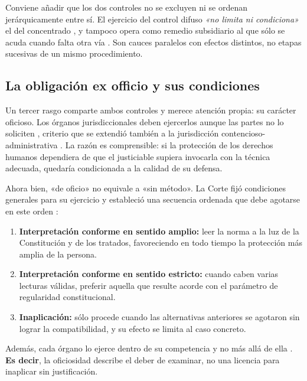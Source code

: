 \documentclass[
  spanish,
  letterpaper, oneside
]{article}
\begin{document}
Conviene añadir que los dos controles no se excluyen ni se ordenan jerárquicamente
entre sí. El ejercicio del control difuso \textit{«no limita ni condiciona»} el del
concentrado \citep{scjnTesis2002264}, y tampoco opera como remedio subsidiario al
que sólo se acuda cuando falta otra vía \citep{scjnTesis2010143}. Son cauces
paralelos con efectos distintos, no etapas sucesivas de un mismo procedimiento.

\subsection{La obligación ex officio y sus condiciones}

Un tercer rasgo comparte ambos controles y merece atención propia: su carácter
oficioso. Los órganos jurisdiccionales deben ejercerlos aunque las partes no lo
soliciten \citep{scjnTesis2003679}, criterio que se extendió también a la
jurisdicción contencioso-administrativa \citep{scjnTesis2005116}. La razón es
comprensible: si la protección de los derechos humanos dependiera de que el
justiciable supiera invocarla con la técnica adecuada, quedaría condicionada a la
calidad de su defensa.

Ahora bien, «de oficio» no equivale a «sin método». La Corte fijó condiciones
generales para su ejercicio \citep{scjnTesis2005622} y estableció una secuencia
ordenada que debe agotarse en este orden \citep{scjnTesis2000073}:

\begin{enumerate}
  \item \textbf{Interpretación conforme en sentido amplio:} leer la norma a la luz de
        la Constitución y de los tratados, favoreciendo en todo tiempo la protección
        más amplia de la persona.
  \item \textbf{Interpretación conforme en sentido estricto:} cuando caben varias
        lecturas válidas, preferir aquella que resulte acorde con el parámetro de
        regularidad constitucional.
  \item \textbf{Inaplicación:} sólo procede cuando las alternativas anteriores se
        agotaron sin lograr la compatibilidad, y su efecto se limita al caso concreto.
\end{enumerate}

Además, cada órgano lo ejerce dentro de su competencia y
no más allá de ella \citep{scjnTesis2009179}. \textbf{Es decir}, la oficiosidad
describe el deber de examinar, no una licencia para inaplicar sin justificación.
\end{document}
